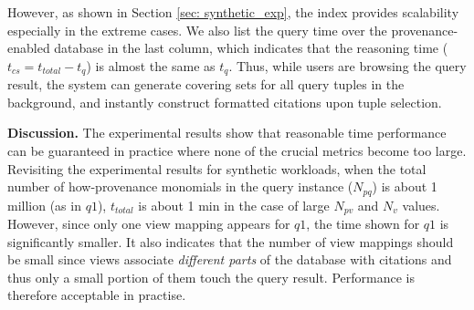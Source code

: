However, as shown in Section \ref{sec: synthetic_exp}, the index provides  scalability especially in the extreme cases. We also list the query time over the provenance-enabled database in the last column, which indicates that the reasoning time ($t_{cs} = t_{total} - t_{q}$) is almost the same as $t_{q}$. Thus, while users are browsing the query result, the system can generate covering sets for all query tuples in the background, and instantly construct formatted citations upon tuple selection.


{\bf Discussion.} The experimental results show that reasonable time performance can be guaranteed in practice where none of the crucial metrics become too large.  Revisiting the experimental results for synthetic workloads, when the total number of how-provenance monomials in the query instance ($N_{pq}$) is about 1 million (as in $q1$), $t_{total}$ is about 1 min in the case of large $N_{pv}$ and $N_v$ values. However, since only one view mapping appears for $q1$, the time shown for $q1$ is  significantly smaller.  It also indicates that the number of view mappings should be small since views associate \textit{different parts} of the database with citations and thus only a small portion of them touch the query result. Performance is therefore acceptable in practise.